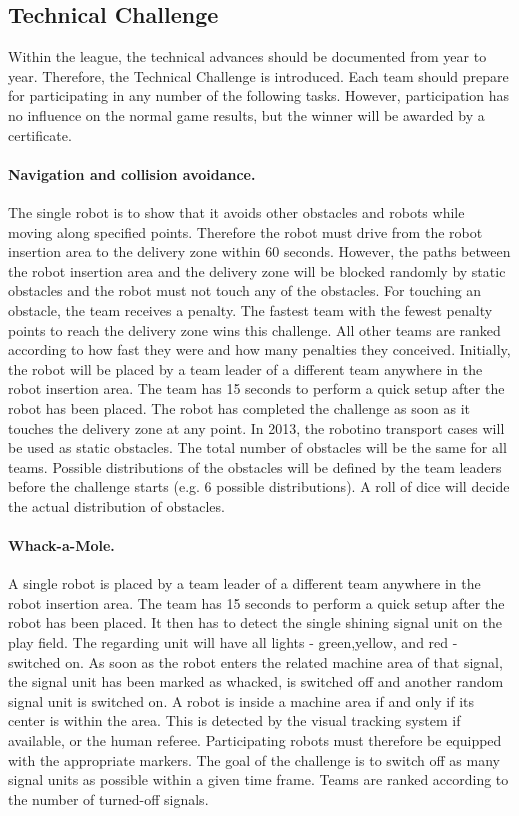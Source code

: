 \documentclass[12pt,twoside]{article}
\begin{document}
\subsection{Technical Challenge}
\label{sec:technical-challenge}
Within the league, the technical advances should be documented from
year to year. Therefore, the Technical Challenge is introduced. Each
team should prepare for participating in any number of the following
tasks. However, participation has no influence on the normal game
results, but the winner will be awarded by a certificate.


\paragraph{Navigation and collision avoidance.~}
The single robot is to show that it avoids other obstacles and robots
while moving along specified points. Therefore the robot must drive
from the robot insertion area to the delivery zone within 60
seconds. However, the paths between the robot insertion area and the delivery
zone will be blocked randomly by static obstacles and the robot must
not touch any of the obstacles. For touching an obstacle, the team
receives a penalty. The fastest team with the fewest penalty points
to reach the delivery zone wins this challenge. All other teams are
ranked according to how fast they were and how many penalties they
conceived. Initially, the robot will be placed by a team leader of a
different team anywhere in the robot insertion area. The team has 15 seconds
to perform a quick setup after the robot has been placed. The robot
has completed the challenge as soon as it touches the delivery zone at
any point. In 2013, the robotino transport cases will be used as
static obstacles. The total number of obstacles will be the same for
all teams. Possible distributions of the obstacles will be defined by
the team leaders before the challenge starts (e.g. 6 possible
distributions).  A roll of dice will decide the actual distribution of
obstacles.
  
\paragraph{Whack-a-Mole.~}
A single robot is placed by a team leader of a different team anywhere 
in the robot insertion area. The team has 15 seconds to perform a quick 
setup after the robot has been placed. It
then has to detect the single shining signal unit on the play
field. The regarding unit will have all lights - green,yellow, and red
- switched on. As soon as the robot enters the related machine area of
that signal, the signal unit has been marked as whacked, is switched off and
another random signal unit is switched on. A robot is inside a machine
area if and only if its center is within the area. This is detected
by the visual tracking system if available, or the human
referee. Participating robots must therefore be equipped with the
appropriate markers. The goal of the challenge is to switch off as
many signal units as possible within a given time frame. Teams are
ranked according to the number of turned-off signals.
  
\end{document}
